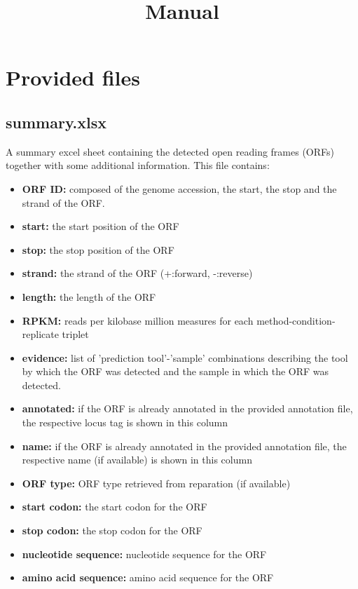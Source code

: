\documentclass[10pt,a4paper]{article}
\title{Manual}
\begin{document}
\maketitle

\section*{Provided files}
\subsection*{summary.xlsx}
A summary excel sheet containing the detected open reading frames (ORFs) together with some additional information. This file contains: 
\begin{itemize}
\item \textbf{ORF ID:} composed of the genome accession, the start, the stop and the strand of the ORF.
\item \textbf{start:} the start position of the ORF
\item \textbf{stop:} the stop position of the ORF
\item \textbf{strand:} the strand of the ORF (+:forward, -:reverse)
\item \textbf{length:} the length of the ORF
\item \textbf{RPKM:} reads per kilobase million measures for each method-condition-replicate triplet
\item \textbf{evidence:} list of 'prediction tool'-'sample' combinations describing the tool by which the ORF was detected and the sample in which the ORF was detected.
\item \textbf{annotated:} if the ORF is already annotated in the provided annotation file, the respective locus tag is shown in this column
\item \textbf{name:} if the ORF is already annotated in the provided annotation file, the respective name (if available) is shown in this column
\item \textbf{ORF type:} ORF type retrieved from reparation (if available)
\item \textbf{start codon:} the start codon for the ORF
\item \textbf{stop codon:} the stop codon for the ORF
\item \textbf{nucleotide sequence:} nucleotide sequence for the ORF
\item \textbf{amino acid sequence:} amino acid sequence for the ORF
\end{itemize}
\end{document}
